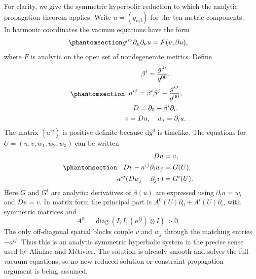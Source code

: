 \documentclass[
  english,
  11pt,
  reqno]{amsart}
\begin{document}
For clarity, we give the symmetric hyperbolic reduction to which the
analytic propagation theorem applies. Write \(u=(g_{\alpha\beta})\) for
the ten metric components. In harmonic coordinates the vacuum equations
have the form
\begin{equation}\protect\phantomsection\label{eq:analytic-persistence-reduced-einstein-equation}{
g^{\mu\nu}\partial_\mu\partial_\nu u
=F(u,\partial u),
}\end{equation} where \(F\) is analytic on the open set of nondegenerate
metrics. Define
\begin{equation}\protect\phantomsection\label{eq:analytic-persistence-symmetric-variables}{\begin{gathered}
\beta^i=\frac{g^{0i}}{g^{00}}, \\
a^{ij}=\beta^i\beta^j-\frac{g^{ij}}{g^{00}}, \\
D=\partial_0+\beta^i\partial_i, \\
v=Du,\quad w_i=\partial_i u.
\end{gathered}}\end{equation} The matrix \((a^{ij})\) is positive definite because
\(\mathrm dy^0\) is timelike. The equations for \(U=(u,v,w_1,w_2,w_3)\)
can be written
\begin{equation}\protect\phantomsection\label{eq:analytic-persistence-symmetric-system}{
\begin{aligned}
Du&=v,\\
Dv-a^{ij}\partial_iw_j&=G(U),\\
a^{ij}(Dw_j-\partial_jv)&=G^i(U).
\end{aligned}
}\end{equation} Here \(G\) and \(G^i\) are analytic: derivatives of
\(\beta(u)\) are expressed using \(\partial_i u=w_i\) and \(Du=v\). In
matrix form the principal part is \(A^0(U)\partial_0+A^i(U)\partial_i\),
with symmetric matrices and \[
A^0=\operatorname{diag}(I,I,(a^{ij})\otimes I)>0.
\] The only off-diagonal spatial blocks couple \(v\) and \(w_j\) through
the matching entries \(-a^{ij}\). Thus this is an analytic symmetric
hyperbolic system in the precise sense used by Alinhac and Métivier. The
solution is already smooth and solves the full vacuum equations, so no
new reduced-solution or constraint-propagation argument is being
assumed.
\end{document}
